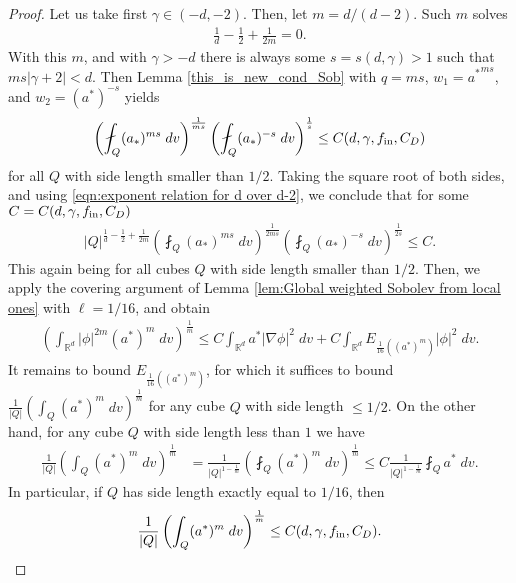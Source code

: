 \documentclass[12pt,american]{amsart}
\numberwithin{equation}{section}
\theoremstyle{plain}
\theoremstyle{definition}                  %
\def\astar{{a^*}}
\def\fin{f_{\textnormal{in}}}
\begin{document}
  \begin{proof}
  Let us take first $\gamma \in (-d,-2)$. Then, let $m =d/(d-2)$. Such $m$ solves
  \begin{align}\label{eqn:exponent relation for d over d-2}
    \frac{1}{d}-\frac{1}{2}+\frac{1}{2m} = 0.	  
  \end{align}	
  With this $m$, and with $\gamma>-d$ there is always some $s=s(d,\gamma)>1$ such that $m s |\gamma+2|<d$. Then Lemma \ref{this_is_new_cond_Sob} with $q=ms$, $w_1 = {a^*}^{ms}$, and $w_2 = (a^*)^{-s}$ yields 
 \begin{align*}
  \left( \fint_Q (a_*)^{m s}\;dv \right)^{\frac{1}{ms}}\left( \fint_Q (a_*)^{-s}\;dv\right)^{\frac{1}{s}} \leq C(d,\gamma,\fin,C_D)
 \end{align*}
  for all $Q$ with side length smaller than $1/2$. Taking the square root of both sides, and using \eqref{eqn:exponent relation for d over d-2}, we conclude that for some $C=C(d,\gamma,\fin,C_D)$
  \begin{align*}
   |Q|^{\frac{1}{d}-\frac{1}{2}+\frac{1}{2m}}\left( \fint_Q (a_*)^{ms}\;dv \right)^{\frac{1}{2ms}}\left( \fint_Q (a_*)^{-s}\;dv\right)^{\frac{1}{2s}} \leq C.
  \end{align*}
  This again being for all cubes $Q$ with side length smaller than $1/2$. Then, we apply the covering argument of Lemma \ref{lem:Global weighted Sobolev from local ones} with $\ell= 1/16$, and obtain
  \begin{align*}
    \left ( \int_{\mathbb{R}^d}|\phi|^{2m}(\astar)^m\;dv\right )^{\frac{1}{m}} \leq C\int_{\mathbb{R}^d}\astar |\nabla \phi|^2\;dv+C\int_{\mathbb{R}^d}E_{\frac{1}{16}((\astar)^m)}|\phi|^2\;dv.
  \end{align*}
  It remains to bound $E_{\frac{1}{16}((\astar)^m)}$, for which it suffices to bound $\frac{1}{|Q|}\left (\int_{Q}(\astar)^m\;dv \right )^{\frac{1}{m}}$ for any cube $Q$ with side length $\leq 1/2$. On the other hand, for any cube $Q$ with side length less than $1$ we have
  \begin{align*}
    \frac{1}{|Q|}\left (\int_{Q}(\astar)^m\;dv \right )^{\frac{1}{m}} & = \frac{1}{|Q|^{1-\frac{1}{m}}}\left (\fint_{Q}(\astar)^m\;dv \right )^{\frac{1}{m}} \leq C\frac{1}{|Q|^{1-\frac{1}{m}}}\fint_{Q}\astar\;dv.
  \end{align*}
  In particular, if $Q$ has side length exactly equal to $1/16$, then
  \begin{align*}
    \frac{1}{|Q|}\left (\int_{Q}(\astar)^m\;dv \right )^{\frac{1}{m}} \leq C(d,\gamma,\fin,C_D).
  \end{align*}

\end{proof}
\end{document}
